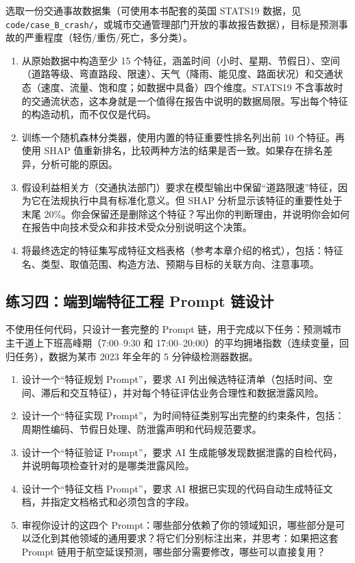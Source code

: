 选取一份交通事故数据集（可使用本书配套的英国 STATS19 数据，见 \texttt{code/case\_B\_crash/}，或城市交通管理部门开放的事故报告数据），目标是预测事故的严重程度（轻伤/重伤/死亡，多分类）。

\begin{enumerate}
  \item 从原始数据中构造至少 15 个特征，涵盖时间（小时、星期、节假日）、空间（道路等级、弯直路段、限速）、天气（降雨、能见度、路面状况）和交通状态（速度、流量、饱和度；如数据中具备）四个维度。STATS19 不含事故时的交通流状态，这本身就是一个值得在报告中说明的数据局限。写出每个特征的构造动机，而不仅仅是代码。
  \item 训练一个随机森林分类器，使用内置的特征重要性排名列出前 10 个特征。再使用 SHAP 值重新排名，比较两种方法的结果是否一致。如果存在排名差异，分析可能的原因。
  \item 假设利益相关方（交通执法部门）要求在模型输出中保留“道路限速”特征，因为它在法规执行中具有标准化意义。但 SHAP 分析显示该特征的重要性处于末尾 20\%。你会保留还是删除这个特征？写出你的判断理由，并说明你会如何在报告中向技术受众和非技术受众分别说明这个决策。
  \item 将最终选定的特征集写成特征文档表格（参考本章介绍的格式），包括：特征名、类型、取值范围、构造方法、预期与目标的关联方向、注意事项。
\end{enumerate}

\subsection*{练习四：端到端特征工程 Prompt 链设计}

不使用任何代码，只设计一套完整的 Prompt 链，用于完成以下任务：预测城市主干道上下班高峰期（7:00--9:30 和 17:00--20:00）的平均拥堵指数（连续变量，回归任务），数据为某市 2023 年全年的 5 分钟级检测器数据。

\begin{enumerate}
  \item 设计一个“特征规划 Prompt”，要求 AI 列出候选特征清单（包括时间、空间、滞后和交互特征），并对每个特征评估业务合理性和数据泄露风险。
  \item 设计一个“特征实现 Prompt”，为时间特征类别写出完整的约束条件，包括：周期性编码、节假日处理、防泄露声明和代码规范要求。
  \item 设计一个“特征验证 Prompt”，要求 AI 生成能够发现数据泄露的自检代码，并说明每项检查针对的是哪类泄露风险。
  \item 设计一个“特征文档 Prompt”，要求 AI 根据已实现的代码自动生成特征文档，并指定文档格式和必须包含的字段。
  \item 审视你设计的这四个 Prompt：哪些部分依赖了你的领域知识，哪些部分是可以泛化到其他领域的通用要求？将它们分别标注出来，并思考：如果把这套 Prompt 链用于航空延误预测，哪些部分需要修改，哪些可以直接复用？
\end{enumerate}





